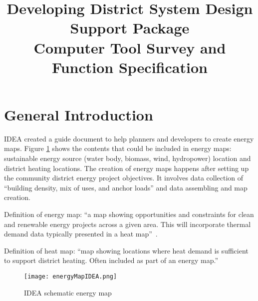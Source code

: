 \documentclass[hidelinks,12pt]{article}
\newcommand{\fref}[1]{Figure \ref{#1}}
\begin{document}
\title{Developing District System Design Support Package \\
       \large Computer Tool Survey and Function Specification}
\maketitle
\tableofcontents
\newpage
\section{General Introduction}
IDEA created a guide document to help planners and developers to
create energy maps. \fref{fig:energyMapIDEA} shows the contents that
could be included in energy maps: sustainable energy source (water
body, biomass, wind, hydropower) location and district heating
locations. The creation of energy maps happens after setting up the
community district energy project objectives. It involves data
collection of ``building density, mix of uses, and anchor loads''\cite
{IDEA2012} and data assembling and map creation.

Definition of energy map: ``a map showing opportunities and
constraints for clean and renewable energy projects across a given
area. This will incorporate thermal demand data typically presented in
a heat map''~\cite{IDEA2012}.  

Definition of heat map: ``map showing locations where heat demand is
sufficient to support district heating. Often included as part of an
energy map.''~\cite{IDEA2012}
\begin{figure}[h!]
  \centering
  \texttt{[image: energyMapIDEA.png]}
  \caption{IDEA schematic energy map~\cite{IDEA2012}}
  \label{fig:energyMapIDEA}
\end{figure}
\end{document}
